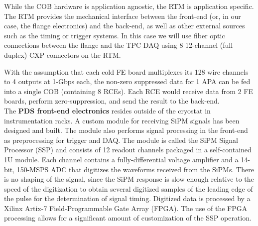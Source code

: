 While the COB hardware is application agnostic, the RTM is application specific.
The RTM provides the mechanical interface between the front-end (or, in our case, the flange electronics)
and the back-end, as well as other external sources such as the timing or trigger systems.
In this case we will use fiber optic connections between the flange and the TPC DAQ using 8 12-channel (full duplex)
CXP connectors on the RTM. 

With the assumption that each cold FE board multiplexes its 128 wire channels to 4 outputs at 1-Gbps each,
the non-zero suppressed data for 1 APA can be fed into a single COB (containing 8 RCEs).
Each RCE would receive data from 2 FE boards, perform zero-suppression, and send the result to the back-end.  \\


The {\bf PDS front-end electronics} resides outside of the cryostat in
instrumentation racks. A custom module for receiving SiPM signals has
been designed and built. The module also performs signal processing in
the front-end as preprocessing for trigger and DAQ.  The module is
called the SiPM Signal Processor (SSP) and consists of 12 readout
channels packaged in a self-contained 1U module.  Each channel
contains a fully-differential voltage amplifier and a 14-bit, 150-MSPS
ADC that digitizes the waveforms received from the SiPMs. There is no shaping of the signal, since the
SiPM response is slow enough relative to the speed of the digitization
to obtain several digitized samples of the leading edge of the pulse
for the determination of signal timing. Digitized data is processed by
a Xilinx Artix-7 Field-Programmable Gate Array (FPGA).  The use of the
FPGA processing allows for a significant amount of customization of
the SSP operation. \\






